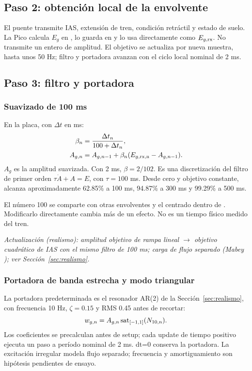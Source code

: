 \subsection{Paso 2: obtención local de la envolvente}
El puente transmite IAS, extensión de tren, condición retráctil y estado de suelo. La Pico calcula $E_g$ en , lo guarda en  y lo usa directamente como $E_{g,\rm rx}$. No transmite un entero de amplitud. El objetivo se actualiza por nueva muestra, hasta unos 50 Hz; filtro y portadora avanzan con el ciclo local nominal de 2 ms.

\subsection{Paso 3: filtro y portadora}
\subsubsection{Suavizado de 100 ms}
En la placa, con $\Delta t$ en ms:
\begin{align}
\beta_n&=\frac{\Delta t_n}{100+\Delta t_n},\\
A_{g,n}&=A_{g,n-1}+\beta_n(E_{g,\rm rx,n}-A_{g,n-1}).
\end{align}
$A_g$ es la amplitud suavizada. Con 2 ms, $\beta=2/102$. Es una discretización del filtro de primer orden $\tau\dot A+A=E$, con $\tau=100$ ms. Desde cero y objetivo constante, alcanza aproximadamente 62.85\% a 100 ms, 94.87\% a 300 ms y 99.29\% a 500 ms.

El número 100 se comparte con otras envolventes y el centrado dentro de . Modificarlo directamente cambia más de un efecto. No es un tiempo físico medido del tren.

\textit{Actualización (realismo): amplitud objetivo de rampa lineal $\rightarrow$ objetivo cuadrático de IAS con el mismo filtro de 100 ms; carga de flujo separado (Mabey \cite{mabey1988}); ver Sección~\ref{sec:realismo}.}

\subsubsection{Portadora de banda estrecha y modo triangular}
La portadora predeterminada es el resonador AR(2) de la Sección~\ref{sec:realismo}, con frecuencia 10 Hz, $\zeta=0.15$ y RMS 0.45 antes de recortar:
\begin{equation}w_{g,n}=A_{g,n}\operatorname{sat}_{[-1,1]}(N_{10,n}).\end{equation}
Los coeficientes se precalculan antes de setup; cada update de tiempo positivo ejecuta un paso a período nominal de 2 ms. dt=0 conserva la portadora. La excitación irregular modela flujo separado; frecuencia y amortiguamiento son hipótesis pendientes de ensayo.

